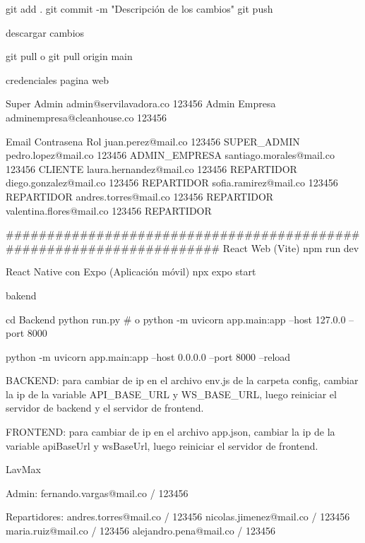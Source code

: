 git add .
git commit -m "Descripción de los cambios"
git push


descargar cambios 

git pull  
o 
git pull origin main




credenciales 
pagina web 

Super Admin	     admin@servilavadora.co	        123456	
Admin Empresa	 adminempresa@cleanhouse.co   	123456

Email	                             Contrasena	Rol
juan.perez@mail.co  	              123456	SUPER_ADMIN
pedro.lopez@mail.co 	              123456	ADMIN_EMPRESA
santiago.morales@mail.co	          123456	CLIENTE
laura.hernandez@mail.co	              123456	REPARTIDOR
diego.gonzalez@mail.co                123456	REPARTIDOR
sofia.ramirez@mail.co	              123456	REPARTIDOR
andres.torres@mail.co	              123456	REPARTIDOR
valentina.flores@mail.co	          123456	REPARTIDOR

#####################################################################
React Web (Vite)
npm run dev

React Native con Expo (Aplicación móvil)
npx expo start


bakend

cd Backend
python run.py
# o
python -m uvicorn app.main:app --host 127.0.0 --port 8000

python -m uvicorn app.main:app --host 0.0.0.0 --port 8000 --reload

BACKEND:
para cambiar de ip en el archivo env.js de la carpeta config,
cambiar la ip de la variable API_BASE_URL y WS_BASE_URL, luego reiniciar el servidor de backend y el servidor de frontend.

FRONTEND:
para cambiar de ip en el archivo app.json, cambiar la ip de la variable apiBaseUrl y wsBaseUrl, luego reiniciar el servidor de frontend.




LavMax

Admin: fernando.vargas@mail.co / 123456

Repartidores:
andres.torres@mail.co / 123456
nicolas.jimenez@mail.co / 123456
maria.ruiz@mail.co / 123456
alejandro.pena@mail.co / 123456